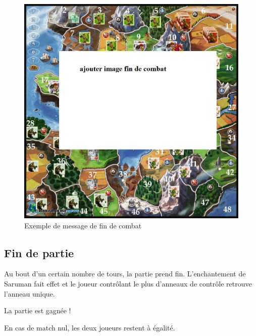 \begin{figure}[ht!]
\centering
\includegraphics[scale=0.40]{img/fincombat.jpg}
\caption{Exemple de message de fin de combat}
\end{figure}

\newpage
\subsection{Fin de partie}

Au bout d'un certain nombre de tours, la partie prend fin. 
\newline
L'enchantement de Saruman fait effet et le joueur contrôlant le plus d'anneaux de contrôle retrouve l'anneau unique. 
\newline
\begin{center}
La partie est gagnée !
\end{center}
\begin{center}
En cas de match nul, les deux joueurs restent à égalité.
\end{center}